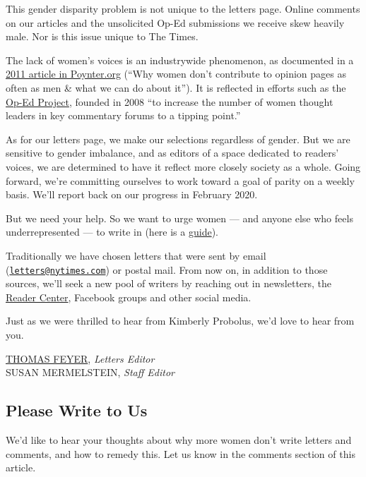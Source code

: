 This gender disparity problem is not unique to the letters page. Online
comments on our articles and the unsolicited Op-Ed submissions we
receive skew heavily male. Nor is this issue unique to The Times.

The lack of women's voices is an industrywide phenomenon, as documented
in a
\href{https://www.poynter.org/reporting-editing/2011/why-women-dont-contribute-to-opinion-pages-as-often-as-men-what-we-can-do-about-it/}{2011
article in Poynter.org} (``Why women don't contribute to opinion pages
as often as men \& what we can do about it''). It is reflected in
efforts such as the \href{https://www.theopedproject.org/}{Op-Ed
Project}, founded in 2008 ``to increase the number of women thought
leaders in key commentary forums to a tipping point.''

As for our letters page, we make our selections regardless of gender.
But we are sensitive to gender imbalance, and as editors of a space
dedicated to readers' voices, we are determined to have it reflect more
closely society as a whole. Going forward, we're committing ourselves to
work toward a goal of parity on a weekly basis. We'll report back on our
progress in February 2020.

But we need your help. So we want to urge women --- and anyone else who
feels underrepresented --- to write in (here is a
\href{https://help.nytimes.com/hc/en-us/articles/115014925288-How-to-submit-a-letter-to-the-editor}{guide}).

Traditionally we have chosen letters that were sent by email
(\href{mailto:letters@nytimes.com}{\nolinkurl{letters@nytimes.com}}) or
postal mail. From now on, in addition to those sources, we'll seek a new
pool of writers by reaching out in newsletters, the
\href{https://www.nytimes.com/section/reader-center}{Reader Center},
Facebook groups and other social media.

Just as we were thrilled to hear from Kimberly Probolus, we'd love to
hear from you.

\href{https://www.nytimes.com/2004/05/23/opinion/23READ.html}{THOMAS
FEYER}, \emph{Letters Editor}\\
SUSAN MERMELSTEIN, \emph{Staff Editor}

\hypertarget{please-write-to-us}{%
\subsection{Please Write to Us}\label{please-write-to-us}}

We'd like to hear your thoughts about why more women don't write letters
and comments, and how to remedy this. Let us know in the comments
section of this article.

